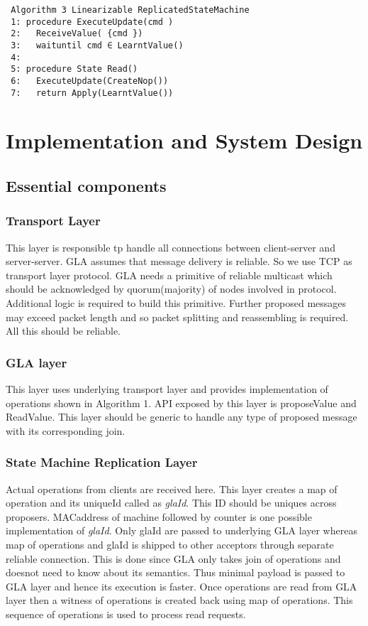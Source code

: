 \documentclass[a4paper,12pt]{report}
\begin{document}
 \begin{verbatim}
 Algorithm 3 Linearizable ReplicatedStateMachine
 1: procedure ExecuteUpdate(cmd )
 2:   ReceiveValue( {cmd })
 3:   waituntil cmd ∈ LearntValue()
 4:
 5: procedure State Read()
 6:   ExecuteUpdate(CreateNop())
 7:   return Apply(LearntValue())
 \end{verbatim}








\newpage
\chapter{Implementation and System Design}             %
\section{Essential components}
\subsection{Transport Layer}
This layer is responsible tp handle all connections between client-server and server-server. GLA assumes that message delivery is reliable. So we use TCP as transport layer protocol. GLA needs a primitive of reliable multicast which should be acknowledged by quorum(majority) of nodes involved in protocol. Additional logic is required to build this primitive. Further proposed messages may exceed packet length and so packet splitting and reassembling is required. All this should be reliable.
\subsection{GLA layer}
This layer uses underlying transport layer and provides implementation of operations shown in Algorithm  1. API exposed by this layer is proposeValue and ReadValue. This layer should be generic to handle any type of proposed message with its corresponding join.
\subsection{State Machine Replication Layer}
Actual operations from clients are received here. This layer creates a map of operation and its uniqueId called as \textit{glaId}. This ID should be uniques across proposers. MACaddress of machine followed by counter is one possible implementation of \textit{glaId}. Only glaId are passed to underlying GLA layer whereas map of operations and glaId is shipped to other acceptors through separate reliable connection.
This is done since GLA only takes join of operations and doesnot need to know about its semantics. Thus minimal payload is passed to GLA layer and hence its execution is faster. Once  operations are read from GLA layer then a witness of operations is created back using map of operations. This sequence of operations is used to process read requests.
\end{document}
